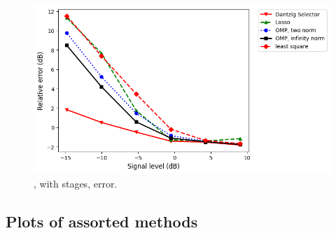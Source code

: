 \begin {figure} [H]
\includegraphics [width = \textwidth] {error-small-wide-four.png}
\caption {, with  stages, error.}
\end {figure}

\subsection {Plots of assorted methods}

